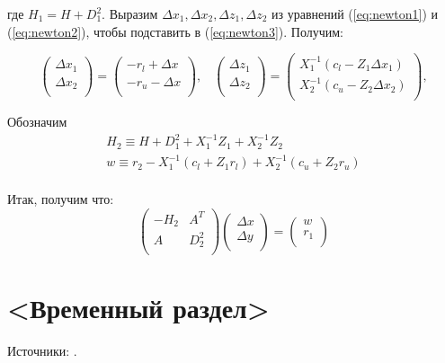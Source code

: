 \documentclass[a4paper, 12pt, titlepage]{article}
\theoremstyle{definition}
\theoremstyle{plain}
\theoremstyle{plain}
\begin{document}
где $H_{1} = H + D_{1}^{2}$. Выразим
$\Delta x_{1}, \Delta x_{2}, \Delta z_{1}, \Delta z_{2}$ из уравнений
(\ref{eq:newton1}) и (\ref{eq:newton2}), чтобы подставить в (\ref{eq:newton3}).
Получим:

\begin{equation}
 \left(
  \begin{array}{c}
   \Delta x_{1} \\
   \Delta x_{2} \\
   \end{array}
 \right) =
 \left(
  \begin{array}{c}
   -r_{l} + \Delta x \\
   -r_{u} - \Delta x \\
   \end{array}
 \right), \;\;\;
 \left(
  \begin{array}{c}
   \Delta z_{1} \\
   \Delta z_{2} \\
   \end{array}
 \right) =
 \left(
  \begin{array}{c}
   X_{1}^{-1} (c_{l} - Z_{1} \Delta x_{1}) \\
   X_{2}^{-1} (c_{u} - Z_{2} \Delta x_{2}) \\
   \end{array}
 \right),
\end{equation}

Обозначим
\begin{equation}
 \begin{aligned}
  H_{2} \equiv H + D_{1}^{2} + X_{1}^{-1} Z_{1} + X_{2}^{-1} Z_{2} \\
  w \equiv r_{2} - X_{1}^{-1} (c_{l} + Z_{1} r_{l})
  + X_{2}^{-1} (c_{u} + Z_{2} r_{u}) \\
 \end{aligned}
\end{equation}

Итак, получим что:
\begin{equation}
 \left(
  \begin{array}{cc}
   -H_{2} & A^{T} \\
   A & D_{2}^{2} \\
   \end{array}
 \right)
 \left(
  \begin{array}{c}
   \Delta x \\
   \Delta y \\
   \end{array}
 \right) =
 \left(
  \begin{array}{c}
   w \\
   r_{1} \\
   \end{array}
 \right)
\end{equation}



\section{<Временный раздел>}

Источники: \cite{BertsekasTsitsiklis1989, BierlaireTointTuyttens1991,
CantarellaPiatek2004, ChenDonohoSaunders2001, Golub1965, Lanczos1950,
PaigeSaunders1982, Saunders2013}.

\newpage


\end{document}
